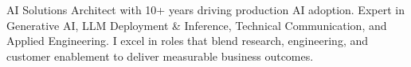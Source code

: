 

\begin{cvparagraph}

AI Solutions Architect with 10+ years driving production AI adoption. Expert in Generative AI, LLM Deployment \& Inference, Technical Communication, and Applied Engineering. I excel in roles that blend research, engineering, and customer enablement to deliver measurable business outcomes.

\end{cvparagraph}
